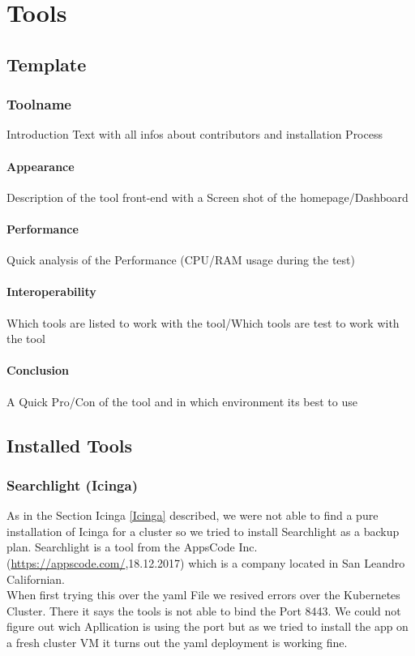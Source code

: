  
\chapter{Tools} %
\section{Template}
\subsection{Toolname}
\label{Toolname} %
Introduction Text with all infos about contributors and installation Process
\subsubsection{Appearance}%
Description of the tool front-end with a Screen shot of the homepage/Dashboard
\subsubsection{Performance}
Quick analysis of the Performance (CPU/RAM usage during the test)
\subsubsection{Interoperability}
Which tools are listed to work with the tool/Which tools are test to work with the tool
\subsubsection{Conclusion}
A Quick Pro/Con of the tool and in which environment its best to use
\section{Installed Tools}%
\subsection{Searchlight (Icinga)}
\label{searchlight}
As in the Section Icinga \ref{Icinga} described, we were not able to find a pure installation of Icinga for a cluster so we tried to install Searchlight as a backup plan.
Searchlight is a tool from the AppsCode Inc. (\url{https://appscode.com/},18.12.2017) which is a company located in San Leandro Californian.
\\
When first trying this over the yaml File we resived errors over the Kubernetes Cluster. There it says the tools is not able to bind the Port 8443. We could not figure out wich Apllication is using the port but as we tried to install the app on a fresh cluster VM it turns out the yaml deployment is working fine.
